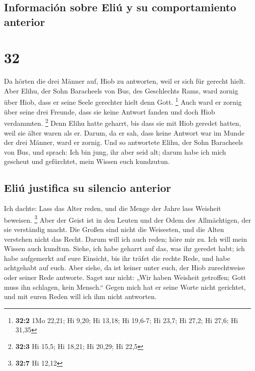\hypertarget{informaciuxf3n-sobre-eliuxfa-y-su-comportamiento-anterior}{%
\subsection{Información sobre Eliú y su comportamiento
anterior}\label{informaciuxf3n-sobre-eliuxfa-y-su-comportamiento-anterior}}

\hypertarget{section-31}{%
\section{32}\label{section-31}}

 Da hörten die drei Männer auf, Hiob zu antworten, weil er
sich für gerecht hielt.  Aber Elihu, der Sohn Baracheels
von Bus, des Geschlechts Rams, ward zornig über Hiob, dass er seine
Seele gerechter hielt denn Gott. \footnote{\textbf{32:2} 1Mo 22,21; Hi
  9,20; Hi 13,18; Hi 19,6-7; Hi 23,7; Hi 27,2; Hi 27,6; Hi 31,35}
 Auch ward er zornig über seine drei Freunde, dass sie
keine Antwort fanden und doch Hiob verdammten. \footnote{\textbf{32:3}
  Hi 15,5; Hi 18,21; Hi 20,29; Hi 22,5}  Denn Elihu hatte
geharrt, bis dass sie mit Hiob geredet hatten, weil sie älter waren als
er.  Darum, da er sah, dass keine Antwort war im Munde der
drei Männer, ward er zornig.  Und so antwortete Elihu, der
Sohn Baracheels von Bus, und sprach: Ich bin jung, ihr aber seid alt;
darum habe ich mich gescheut und gefürchtet, mein Wissen euch kundzutun.

\hypertarget{eliuxfa-justifica-su-silencio-anterior}{%
\subsection{Eliú justifica su silencio
anterior}\label{eliuxfa-justifica-su-silencio-anterior}}

 Ich dachte: Lass das Alter reden, und die Menge der Jahre
lass Weisheit beweisen. \footnote{\textbf{32:7} Hi 12,12} 
Aber der Geist ist in den Leuten und der Odem des Allmächtigen, der sie
verständig macht.  Die Großen sind nicht die Weisesten,
und die Alten verstehen nicht das Recht.  Darum will ich
auch reden; höre mir zu. Ich will mein Wissen auch kundtun.
 Siehe, ich habe geharrt auf das, was ihr geredet habt;
ich habe aufgemerkt auf eure Einsicht, bis ihr träfet die rechte Rede,
 und habe achtgehabt auf euch. Aber siehe, da ist keiner
unter euch, der Hiob zurechtweise oder seiner Rede antworte.
 Saget nur nicht: „Wir haben Weisheit getroffen; Gott
muss ihn schlagen, kein Mensch.``  Gegen mich hat er
seine Worte nicht gerichtet, und mit euren Reden will ich ihm nicht
antworten.


